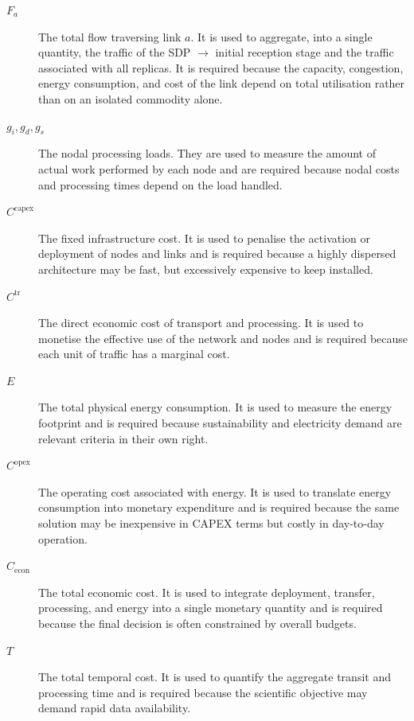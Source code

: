 \documentclass[a4paper,fleqn]{cas-dc}
\begin{document}
\begin{description}

\item[\(F_a\)] The total flow traversing link \(a\). It is used to aggregate, into a single quantity, the traffic of the SDP \(\to\) initial reception stage and the traffic associated with all replicas. It is required because the capacity, congestion, energy consumption, and cost of the link depend on total utilisation rather than on an isolated commodity alone. 

\item[\(g_i,g_d,g_s\)] The nodal processing loads. They are used to measure the amount of actual work performed by each node and are required because nodal costs and processing times depend on the load handled. 

\item[\(C^{\mathrm{capex}}\)] The fixed infrastructure cost. It is used to penalise the activation or deployment of nodes and links and is required because a highly dispersed architecture may be fast, but excessively expensive to keep installed. 

\item[\(C^{\mathrm{tr}}\)] The direct economic cost of transport and processing. It is used to monetise the effective use of the network and nodes and is required because each unit of traffic has a marginal cost. 

\item[\(E\)] The total physical energy consumption. It is used to measure the energy footprint and is required because sustainability and electricity demand are relevant criteria in their own right. 

\item[\(C^{\mathrm{opex}}\)] The operating cost associated with energy. It is used to translate energy consumption into monetary expenditure and is required because the same solution may be inexpensive in CAPEX terms but costly in day-to-day operation. 

\item[\(C_{\mathrm{econ}}\)] The total economic cost. It is used to integrate deployment, transfer, processing, and energy into a single monetary quantity and is required because the final decision is often constrained by overall budgets. 

\item[\(T\)] The total temporal cost. It is used to quantify the aggregate transit and processing time and is required because the scientific objective may demand rapid data availability. 


\end{description}
\end{document}
